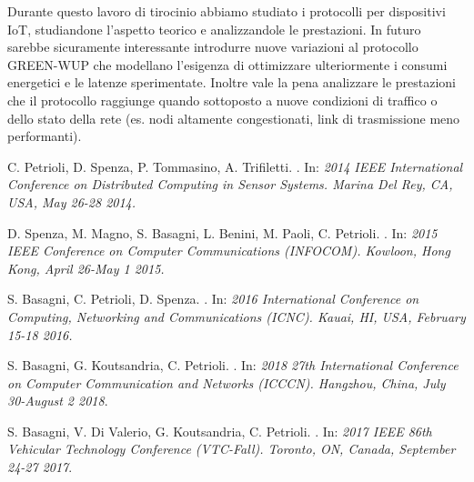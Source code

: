 \documentclass[binding=0.6cm,TFA]{sapthesis}
\begin{document}
Durante questo lavoro di tirocinio abbiamo studiato i protocolli per dispositivi IoT, studiandone l'aspetto teorico e analizzandole le prestazioni. In futuro
sarebbe sicuramente interessante introdurre nuove variazioni al protocollo GREEN-WUP che modellano l'esigenza di ottimizzare ulteriormente i consumi energetici
e le latenze sperimentate. Inoltre vale la pena analizzare le prestazioni che il protocollo raggiunge quando sottoposto a nuove condizioni di traffico o dello
stato della rete (es. nodi altamente congestionati, link di trasmissione meno performanti).


\backmatter
\cleardoublepage
{} %

\begin{thebibliography}{9}

    C. Petrioli, D. Spenza, P. Tommasino, A. Trifiletti.
    .
    In: \textit{2014 IEEE International Conference on Distributed Computing in Sensor Systems. Marina Del Rey, CA, USA, May 26-28 2014.}

    D. Spenza, M. Magno, S. Basagni, L. Benini, M. Paoli, C. Petrioli.
    .
    In: \textit{2015 IEEE Conference on Computer Communications (INFOCOM). Kowloon, Hong Kong, April 26-May 1 2015.}

    S. Basagni, C. Petrioli, D. Spenza.
    .
    In: \textit{2016 International Conference on Computing, Networking and Communications (ICNC). Kauai, HI, USA, February 15-18 2016.}

    S. Basagni, G. Koutsandria, C. Petrioli.
    .
    In: \textit{2018 27th International Conference on Computer Communication and Networks (ICCCN). Hangzhou, China, July 30-August 2 2018}.

    S. Basagni, V. Di Valerio, G. Koutsandria, C. Petrioli.
    .
    In: \textit{2017 IEEE 86th Vehicular Technology Conference (VTC-Fall). Toronto, ON, Canada, September 24-27 2017}.


\end{thebibliography}
\end{document}
